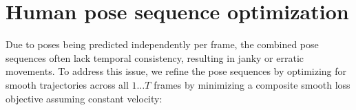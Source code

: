 





\section{Human pose sequence optimization}
Due to poses being predicted independently per frame, the combined pose sequences often lack temporal consistency, resulting in janky or erratic movements. To address this issue, we refine the pose sequences by optimizing for smooth trajectories across all $1 \dots T$ frames by minimizing a composite smooth loss objective assuming constant velocity:

